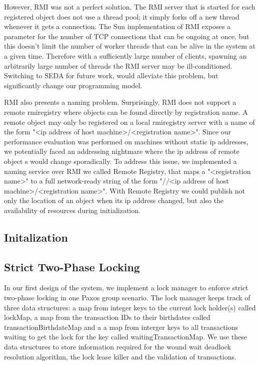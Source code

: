 \documentclass[10pt,twocolumn]{article}
\begin{document}
However, RMI was not a perfect solution. The RMI server that is started for each registered object does not use a thread pool; it simply forks off a new thread whenever it gets a connection. The Sun implementation of RMI exposes a parameter for the number of TCP connections that can be ongoing at once, but this doesn't limit the number of worker threads that can be alive in the system at a given time. Therefore with a sufficiently large number of clients, spawning an arbitrarily large number of threads the RMI server may be ill-conditioned. Switching to SEDA \cite{welsh_seda:_2001} for future work, would alleviate this problem, but significantly change our programming model.

RMI also presents a naming problem. Surprisingly, RMI does not support a remote rmiregistry where objects can be found directly by registration name. A remote object may only be registered on a local rmiregistry server with a name of the form "\textless{}ip address of host machine\textgreater{}/\textless{}registration name\textgreater{}".  Since our performance evaluation was performed on machines without static ip addresses, we potentially faced an addressing nightmare where the ip address of remote object s would change sporadically. To address this issue, we implemented a naming service over RMI we called Remote Registry, that maps a "\textless{}registration name\textgreater{}" to a full network-ready string of the form "//\textless{}ip address of host machine\textgreater{}/\textless{}registration name\textgreater{}". With Remote Registry we could publish not only the location of an object when its ip address changed, but also the availability of resources during initialization.

\subsection{Initalization}

\subsection{Strict Two-Phase Locking}
In our first design of the system, we implement a lock manager to enforce strict two-phase locking in one Paxos group scenario. The lock manager keeps track of three data structures: a map from integer keys to the current lock holder(s) called lockMap, a map from the transaction IDs to their birthdates called transactionBirthdateMap and a a map from interger keys to all transactions waiting to get the lock for the key called waitingTransactionMap. We use these data structures to store information required for the wound wait deadlock resolution algorithm,  the lock lease killer and the validation of transactions. 
\end{document}
